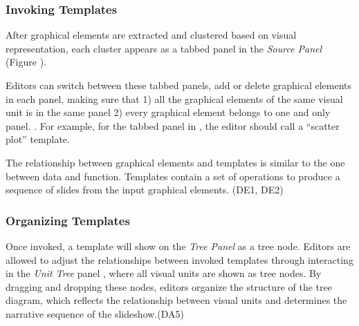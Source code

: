 \subsubsection{Invoking Templates} 

After graphical elements are extracted and clustered based on visual representation, each cluster appears as a tabbed panel in the \textit{Source Panel} (Figure ). 

Editors can switch between these tabbed panels, add or delete graphical elements in each panel, making sure that 1) all the graphical elements of the same visual unit is in the same panel 2) every graphical element belongs to one and only panel.  . For example, for the tabbed panel in , the editor should call a ``scatter plot'' template.

The relationship between graphical elements and templates is similar to the one between data and function. Templates contain a set of operations to produce a sequence of slides from the input graphical elements.  (DE1, DE2) 

\subsubsection{Organizing Templates} 
Once invoked, a template will show on the \textit{Tree Panel} as a tree node. 
Editors are allowed to adjust the relationships between invoked templates through interacting in the \textit{Unit Tree} panel , where all visual units are shown as tree nodes.
By dragging and dropping these nodes, editors organize the structure of the tree diagram, which reflects the relationship between visual units and determines the narrative sequence of the slideshow.(DA5) 

